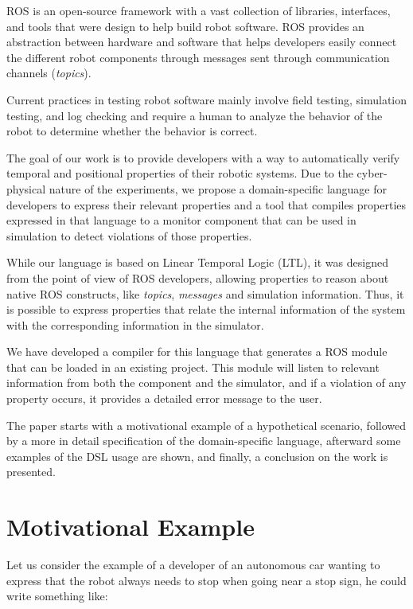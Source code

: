 \documentclass[runningheads]{llncs}
\begin{document}
ROS is an open-source framework with a vast collection of libraries, interfaces, and tools that were design to help build robot software. ROS provides an abstraction between hardware and software that helps developers easily connect the different robot components through messages sent through communication channels (\textit{topics}).

Current practices in testing robot software mainly involve field testing, simulation testing, and log checking and require a human to analyze the behavior of the robot to determine whether the behavior is correct.

The goal of our work is to provide developers with a way to automatically verify temporal and positional properties of their robotic systems. Due to the cyber-physical nature of the experiments, we propose a domain-specific language for developers to express their relevant properties and a tool that compiles properties expressed in that language to a monitor component that can be used in simulation to detect violations of those properties.

While our language is based on Linear Temporal Logic (LTL), it was designed from the point of view of ROS developers, allowing properties to reason about native ROS constructs, like \textit{topics}, \textit{messages} and simulation information. Thus, it is possible to express properties that relate the internal information of the system with the corresponding information in the simulator.

We have developed a compiler for this language that generates a ROS module that can be loaded in an existing project. This module will listen to relevant information from both the component and the simulator, and if a violation of any property occurs, it provides a detailed error message to the user.

The paper starts with a motivational example of a hypothetical scenario, followed by a more in detail specification of the domain-specific language, afterward some examples of the DSL usage are shown, and finally, a conclusion on the work is presented.

\section{Motivational Example}

Let us consider the example of a developer of an autonomous car wanting to express that the robot always needs to stop when going near a stop sign, he could write something like:
\end{document}
